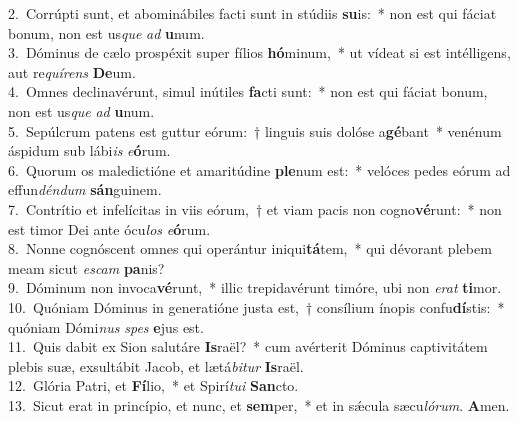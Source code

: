 {2.~}Corrúpti sunt, et abominábiles facti sunt in stúdiis \textbf{su}is:~* non est qui fáciat bonum, non est us\textit{que} \textit{ad} \textbf{u}num.\\
{3.~}Dóminus de cælo prospéxit super fílios \textbf{hó}minum,~* ut vídeat si est intélligens, aut re\textit{quí}\textit{rens} \textbf{De}um.\\
{4.~}Omnes declinavérunt, simul inútiles \textbf{fa}cti sunt:~* non est qui fáciat bonum, non est us\textit{que} \textit{ad} \textbf{u}num.\\
{5.~}Sepúlcrum patens est guttur eórum:~† linguis suis dolóse a\textbf{gé}bant~* venénum áspidum sub lábi\textit{is} \textit{e}\textbf{ó}rum.\\
{6.~}Quorum os maledictióne et amaritúdine \textbf{ple}num est:~* velóces pedes eórum ad effun\textit{dén}\textit{dum} \textbf{sán}guinem.\\
{7.~}Contrítio et infelícitas in viis eórum,~† et viam pacis non cogno\textbf{vé}runt:~* non est timor Dei ante ócu\textit{los} \textit{e}\textbf{ó}rum.\\
{8.~}Nonne cognóscent omnes qui operántur iniqui\textbf{tá}tem,~* qui dévorant plebem meam sicut \textit{e}\textit{scam} \textbf{pa}nis?\\
{9.~}Dóminum non invoca\textbf{vé}runt,~* illic trepidavérunt timóre, ubi non \textit{e}\textit{rat} \textbf{ti}mor.\\
{10.~}Quóniam Dóminus in generatióne justa est,~† consílium ínopis confu\textbf{dí}stis:~* quóniam Dómi\textit{nus} \textit{spes} \textbf{e}jus est.\\
{11.~}Quis dabit ex Sion salutáre \textbf{Is}raël?~* cum avérterit Dóminus captivitátem plebis suæ, exsultábit Jacob, et lætá\textit{bi}\textit{tur} \textbf{Is}raël.\\
{12.~}Glória Patri, et \textbf{Fí}lio,~* et Spirí\textit{tu}\textit{i} \textbf{San}cto.\\
{13.~}Sicut erat in princípio, et nunc, et \textbf{sem}per,~* et in sǽcula sæcu\textit{ló}\textit{rum}. \textbf{A}men.\\
